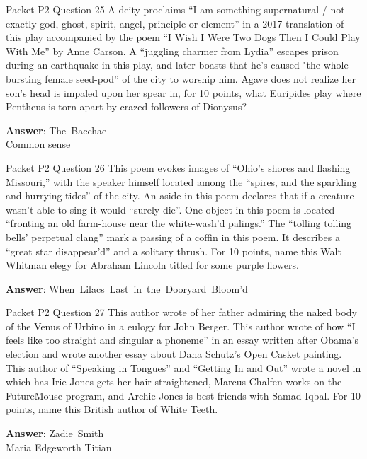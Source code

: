 \begin{frame}{Packet P2 Question 25}
A deity proclaims ``I am something supernatural / not exactly god,   ghost, spirit, angel, principle or element'' in a 2017 translation of this play accompanied by the poem ``I Wish I Were Two Dogs Then I Could Play With Me'' by Anne Carson. A “juggling charmer from Lydia” escapes prison during an earthquake in this play, and later boasts that he's caused "the whole bursting female seed-pod” of the city to worship him. Agave does not realize her son's head is impaled upon her spear in, for 10 points, what Euripides play where     Pentheus is torn   apart by crazed followers   of Dionysus?

\textbf{Answer}: The\ Bacchae\\
 Common sense
\end{frame}

\begin{frame}{Packet P2 Question 26}
This poem evokes images of ``Ohio's shores and flashing Missouri,''     with the speaker himself located among the ``spires, and the sparkling and hurrying tides'' of the city. An aside in this poem declares that if a creature wasn't able to sing it would ``surely die''. One object in this poem is located ``fronting an old farm-house near the white-wash'd palings.'' The ``tolling tolling bells' perpetual clang'' mark a passing of a   coffin in this poem. It describes a ``great star disappear'd'' and a solitary thrush. For 10 points, name this Walt Whitman elegy for Abraham   Lincoln titled for some purple flowers.

\textbf{Answer}: When\ Lilacs\ Last\ in\ the\ Dooryard\ Bloom'd\\
\end{frame}

\begin{frame}{Packet P2 Question 27}
This author wrote of her   father admiring the naked body of the Venus of Urbino in   a eulogy for John Berger. This author wrote of how “I feels like too straight and singular a phoneme” in an essay written after Obama’s election and wrote another essay about Dana Schutz's Open Casket painting. This author of ``Speaking in Tongues'' and ``Getting In and Out'' wrote a novel in which has Irie Jones gets her hair straightened, Marcus Chalfen works   on the FutureMouse program, and Archie Jones is best friends with Samad Iqbal. For       10 points, name this British author of White Teeth.

\textbf{Answer}: Zadie\ Smith\\
 Maria Edgeworth
 Titian
\end{frame}

